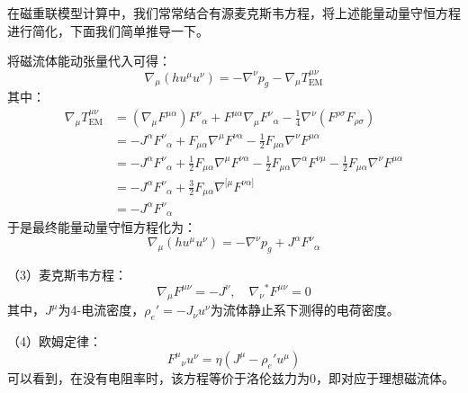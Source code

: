 \documentclass[lang=cn,color=blue,cm,11pt,scheme=chinese,bibend=bibtex,sorting=nty]{elegantbook}
\begin{document}
	\begin{note}
		在磁重联模型计算中，我们常常结合有源麦克斯韦方程，将上述能量动量守恒方程进行简化，下面我们简单推导一下。
		
		将磁流体能动张量代入可得：
		\begin{equation}
			\nabla_{\mu} (h u^{\mu} u^{\nu}) = - \nabla^{\nu} p_g - \nabla_{\mu} T^{\mu \nu}_{\text{EM}}
		\end{equation}
		其中：
		\begin{align*}
			\nabla_{\mu} T^{\mu \nu}_{\text{EM}} & = (\nabla_{\mu} F^{\mu \alpha}) F^{\nu}{}_{\alpha} + F^{\mu \alpha} \nabla_{\mu} F^{\nu}{}_{\alpha} - \frac{1}{4} \nabla^{\nu} (F^{\rho \sigma} F_{\rho \sigma})\\
			& = - J^{\alpha} F^{\nu}{}_{\alpha} + F_{\mu \alpha} \nabla^{\mu} F^{\nu \alpha} - \frac{1}{2} F_{\mu \alpha} \nabla^{\nu} F^{\mu \alpha}\\
			& = - J^{\alpha} F^{\nu}{}_{\alpha} + \frac{1}{2} F_{\mu \alpha} \nabla^{\mu} F^{\nu \alpha} - \frac{1}{2} F_{\mu \alpha} \nabla^{\alpha} F^{\nu \mu} - \frac{1}{2} F_{\mu \alpha} \nabla^{\nu} F^{\mu \alpha}\\
			& = - J^{\alpha} F^{\nu}{}_{\alpha} + \frac{3}{2} F_{\mu \alpha} \nabla^{[\mu} F^{\nu \alpha]}\\
			& = - J^{\alpha} F^{\nu}{}_{\alpha}
		\end{align*}
		于是最终能量动量守恒方程化为：
		\begin{equation}
			\nabla_{\mu} (h u^{\mu} u^{\nu}) = - \nabla^{\nu} p_g + J^{\alpha} F^{\nu}{}_{\alpha}
		\end{equation}
	\end{note}
	
	（3）麦克斯韦方程：
	\begin{equation}
		\nabla_{\mu} F^{\mu \nu} = - J^{\nu}, \quad \nabla_{\nu} {}^{*}F^{\mu \nu} = 0
	\end{equation}
	其中，$J^{\mu}$为4-电流密度，$\rho_e' = - J_{\nu} u^{\nu}$为流体静止系下测得的电荷密度。
	
	（4）欧姆定律：
	\begin{equation}
		F^{\mu}{}_{\nu} u^{\nu} = \eta (J^{\mu} - \rho_e' u^{\mu})
	\end{equation}
	可以看到，在没有电阻率时，该方程等价于洛伦兹力为0，即对应于理想磁流体。
	
\end{document}
